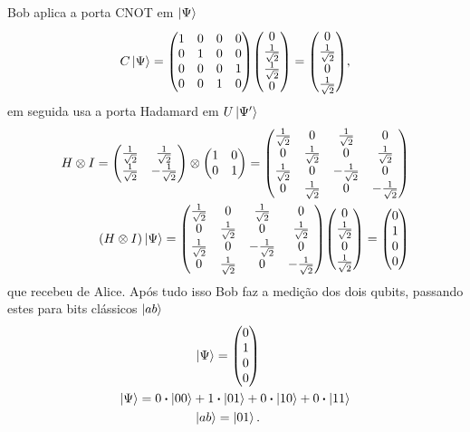 \documentclass[a4paper, 12pt, oneside]{book}
\begin{document}
Bob aplica a porta CNOT em $\ket{\Psi}$
\begin{equation}
C\ket{\Psi} = \mqty(1&0&0&0\\0&1&0&0\\0&0&0&1\\0&0&1&0) 
			\mqty(0\\ \frac{1}{\sqrt{2}}\\ \frac{1}{\sqrt{2}}\\0)
		= \mqty(0\\ \frac{1}{\sqrt{2}}\\ 0\\ \frac{1}{\sqrt{2}}),
\end{equation}
em seguida usa a porta Hadamard em $U\ket{\Psi'}$
\begin{align}
H \otimes I = \mqty(\frac{1}{\sqrt{2}}&\frac{1}{\sqrt{2}}\\
				\frac{1}{\sqrt{2}}&-\frac{1}{\sqrt{2}} ) 
	\otimes \mqty(1&0\\0&1) 
= \mqty(\frac{1}{\sqrt{2}}&0&\frac{1}{\sqrt{2}}&0\\
	0&\frac{1}{\sqrt{2}}&0&\frac{1}{\sqrt{2}} \\
	\frac{1}{\sqrt{2}}&0&-\frac{1}{\sqrt{2}}&0 \\
	0&\frac{1}{\sqrt{2}}&0&-\frac{1}{\sqrt{2}}) \\
(H \otimes I)\ket{\Psi} =  \mqty(\frac{1}{\sqrt{2}}&0&\frac{1}{\sqrt{2}}&0\\
	0&\frac{1}{\sqrt{2}}&0&\frac{1}{\sqrt{2}} \\
	\frac{1}{\sqrt{2}}&0&-\frac{1}{\sqrt{2}}&0 \\
	0&\frac{1}{\sqrt{2}}&0&-\frac{1}{\sqrt{2}}) 
	\mqty(0\\ \frac{1}{\sqrt{2}}\\ 0\\ \frac{1}{\sqrt{2}}) = \mqty(0\\1\\0\\0)
\end{align}
que recebeu de Alice. Após tudo isso Bob faz a medição dos dois qubits, passando estes para bits clássicos $\ket{ab}$
\begin{align}
\ket{\Psi} = \mqty(0\\1\\0\\0) \hspace{2.5cm} \\
\ket{\Psi} = 0\vdot\ket{00} + 1\vdot\ket{01} + 0\vdot\ket{10} + 0\vdot\ket{11} \\
\ket{ab} = \ket{01}. \hspace{2.5cm}
\end{align}
\end{document}
